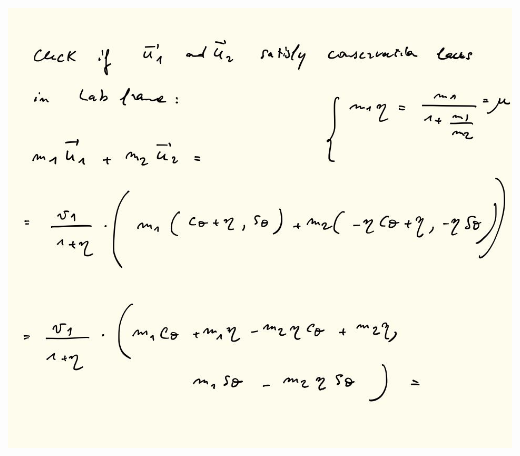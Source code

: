 \documentclass[fleqn]{article}
\begin{document}
\begin{center}
  \includegraphics[height=18cm, width=18cm]{7.JPG}
\end{center}

\pagebreak
\end{document}
